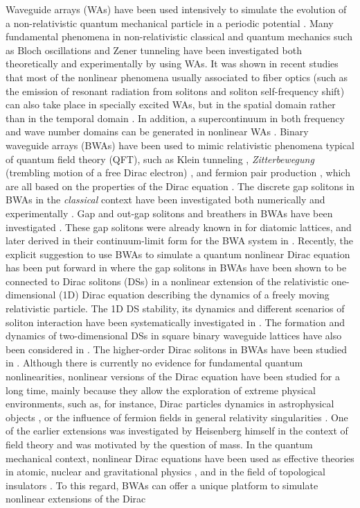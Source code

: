 \documentclass[twocolumn,aps, prl,showpacs]{revtex4}
\begin{document}
Waveguide arrays (WAs) have been used intensively to simulate the evolution of a non-relativistic quantum mechanical particle in a periodic potential \cite{lederer}. Many fundamental phenomena in non-relativistic classical and quantum mechanics such as Bloch oscillations \cite{pertsch,morandotti2} and Zener tunneling \cite{ghulinyan,trompeter} have been investigated both theoretically and experimentally by using WAs. It was shown in recent studies that most of the nonlinear phenomena usually associated to fiber optics (such as the emission of resonant radiation from solitons and soliton self-frequency shift) can also take place in specially excited WAs, but in the spatial domain rather than in the temporal domain \cite{tranresonant1,tranresonant2}. In addition, a supercontinuum in both frequency and wave number domains can be generated in nonlinear WAs \cite{tranresonant3}. Binary waveguide arrays (BWAs) have been used to mimic relativistic phenomena typical of quantum field theory (QFT), such as Klein tunneling \cite{longhi1,dreisow2}, {\em  Zitterbewegung} (trembling motion of a free Dirac electron) \cite{longhi2,dreisow}, and fermion pair production \cite{longhi3}, which are all based on the properties of the Dirac equation \cite{zeuner}. The discrete gap solitons in BWAs in the {\em classical} context have been investigated both numerically \cite{sukhorukov1,conforti11} and experimentally \cite{morandotti}. Gap and out-gap solitons and breathers in BWAs have been investigated  \cite{johansson1,johansson2}. These gap solitons were already known in \cite{kivshar2} for diatomic lattices, and later derived in their continuum-limit form for the BWA system in \cite{johansson1}. Recently, the explicit suggestion to use BWAs to simulate a quantum nonlinear Dirac equation has been put forward in \cite{trandirac1} where the gap solitons in BWAs have been shown to be connected to Dirac solitons (DSs) in a nonlinear extension of the relativistic one-dimensional (1D) Dirac equation describing the dynamics of a freely moving relativistic particle. The 1D DS stability, its dynamics and different scenarios of soliton interaction have been systematically investigated in \cite{trandirac2}. The formation and dynamics of two-dimensional DSs in square binary waveguide lattices have also been considered in \cite{trandirac3}. The higher-order Dirac solitons in BWAs have been studied in \cite{trandirac4}. Although there is currently no evidence for fundamental quantum nonlinearities, nonlinear versions of the Dirac equation have been studied for a long time, mainly because they allow the exploration of extreme physical environments, such as, for instance, Dirac particles dynamics in astrophysical objects \cite{marini}, or the influence of fermion fields in general relativity singularities \cite{poplawski}. One of the earlier extensions was investigated by Heisenberg himself \cite{Heisenberg57} in the context of field theory and was motivated by the question of mass. In the quantum mechanical context, nonlinear Dirac equations have been used as effective theories in atomic, nuclear and gravitational physics \cite{NLD1,NLD2,NLD3,NLD4}, and in the field of topological insulators \cite{topological}. To this regard, BWAs can offer a unique platform to simulate nonlinear extensions of the Dirac 
\end{document}
